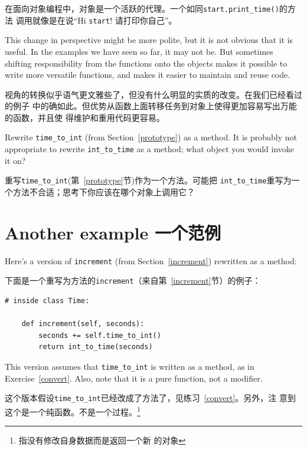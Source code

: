 \documentclass[10pt]{book}
\begin{document}
\begin{CJK}{UTF8}{gbsn}
\begin{itemize}
在面向对象编程中，对象是一个活跃的代理。一个如同\verb"start.print_time()"的方法
调用就像是在说``Hi {\tt start}! 请打印你自己''。

\end{itemize}

This change in perspective might be more polite, but it is not obvious
that it is useful.  In the examples we have seen so far, it may not
be.  But sometimes shifting responsibility from the functions onto the
objects makes it possible to write more versatile functions, and makes
it easier to maintain and reuse code.

视角的转换似乎语气更文雅些了，但没有什么明显的实质的改变。在我们已经看过的例子
中的确如此。但优势从函数上面转移任务到对象上使得更加容易写出万能的函数，并且使
得维护和重用代码更容易。

\begin{exercise}
\label{convert}

Rewrite \verb"time_to_int" (from Section~\ref{prototype}) as a method.
It is probably not appropriate to rewrite \verb"int_to_time" as a
method; what object you would invoke it on?

重写\verb"time_to_int"(第~\ref{prototype}节)作为一个方法。可能把
\verb"int_to_time"重写为一个方法不合适；思考下你应该在哪个对象上调用它？

\end{exercise}


\section{Another example 一个范例}

Here's a version of {\tt increment} (from Section~\ref{increment})
rewritten as a method:

下面是一个重写为方法的{\tt increment}（来自第~\ref{increment}节）的例子：

\begin{verbatim}
# inside class Time:

    def increment(self, seconds):
        seconds += self.time_to_int()
        return int_to_time(seconds)
\end{verbatim}
%
This version assumes that \verb"time_to_int" is written
as a method, as in Exercise~\ref{convert}.  Also, note that
it is a pure function, not a modifier.

这个版本假设\verb"time_to_int"已经改成了方法了，见练习~\ref{convert}。另外，注
意到这个是一个纯函数。不是一个过程。\footnote{指没有修改自身数据而是返回一个新
的对象}


\end{CJK}
\end{document}
